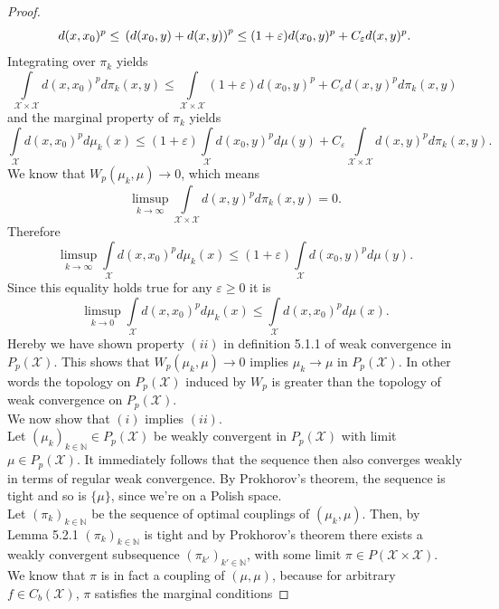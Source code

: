 \documentclass[11pt,a4paper]{article}
\begin{document}
\begin{proof}
\[
d(x,x_0)^p\leq{}\left(d(x_0,y)+d(x,y)\right)^p \leq (1+\varepsilon)d(x_0,y)^p+C_{\varepsilon}d(x,y)^p.
\vspace{1em}
\] 
Integrating over $\pi_k$ yields
\[
\int\limits_{\mathcal{X\times{}X}}d(x,x_0)^pd\pi_k(x,y) \leq \int\limits_{\mathcal{X\times{}X}}(1+\varepsilon)d(x_0,y)^p + C_{\varepsilon}d(x,y)^pd\pi_k(x,y)
\]
and the marginal property of $\pi_k$ yields
\[
\int\limits_{\mathcal{X}}d(x,x_0)^pd\mu_k(x) \leq (1+\varepsilon)\int\limits_{\mathcal{X}}d(x_0,y)^pd\mu(y) + C_{\varepsilon}\int\limits_{\mathcal{X\times{}X}}d(x,y)^pd\pi_k(x,y).
\]
We know that $W_p(\mu_k,\mu)\rightarrow{}0$, which means 
\[
\limsup\limits_{k\rightarrow{}\infty}\int\limits_{\mathcal{X\times{}X}}d(x,y)^pd\pi_k(x,y) = 0.
\]
Therefore
\[
\limsup\limits_{k\rightarrow\infty}\int\limits_{\mathcal{X}}d(x,x_0)^pd\mu_k(x) \leq(1+\varepsilon)\int\limits_{\mathcal{X}}d(x_0,y)^pd\mu(y).
\]
Since this equality holds true for any $\varepsilon\geq{}0$ it is \vspace{1em}
\[
\limsup\limits_{k\rightarrow{}0}\int\limits_{\mathcal{X}}d(x,x_0)^pd\mu_k(x) \leq\int\limits_{\mathcal{X}}d(x,x_0)^pd\mu(x).
\]
Hereby we have shown property $(ii)$ in definition 5.1.1 of weak convergence in $P_p(\mathcal{X})$. This shows that $W_p(\mu_k,\mu)\rightarrow{}0$ implies $\mu_k\rightarrow{}\mu$ in $P_p(\mathcal{X})$. In other words the topology on $P_p(\mathcal{X})$ induced by $W_p$ is greater than the topology of weak convergence on $P_p(\mathcal{X})$.\vspace{1em}\\
We now show that $(i)$ implies $(ii)$. \\
Let $(\mu_k)_{k\in\mathbb{N}}\in{}P_p(\mathcal{X})$ be weakly convergent in $P_p(\mathcal{X})$ with limit $\mu\in{}P_p(\mathcal{X})$. It immediately follows that the sequence then also converges weakly in terms of regular weak convergence. By Prokhorov's theorem, the sequence is tight and so is $\{\mu\}$, since we're on a Polish space.\vspace{1em}\\ Let $(\pi_k)_{k\in\mathbb{N}}$ be the sequence of optimal couplings of $(\mu_k,\mu)$. Then, by Lemma 5.2.1 $(\pi_k)_{k\in\mathbb{N}}$ is tight and by Prokhorov's theorem there exists a weakly convergent subsequence $(\pi_{k'})_{k'\in\mathbb{N}}$, with some limit $\pi\in{}P(\mathcal{X\times{}X})$.\vspace{1em}\\
We know that $\pi$ is in fact a coupling of $(\mu,\mu)$, because for arbitrary $f\in{}C_b(\mathcal{X})$, $\pi$ satisfies the marginal conditions

\end{proof}
\end{document}
